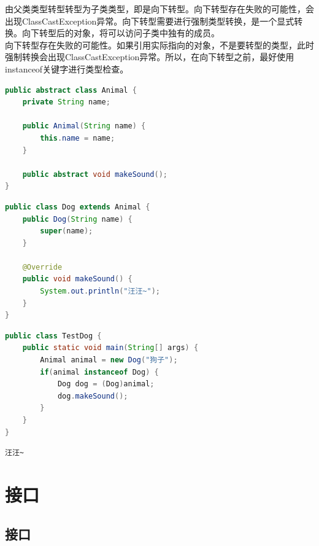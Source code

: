 由父类类型转型转型为子类类型，即是向下转型。向下转型存在失败的可能性，会出现ClassCastException异常。向下转型需要进行强制类型转换，是一个显式转换。向下转型后的对象，将可以访问子类中独有的成员。\\

向下转型存在失败的可能性。如果引用实际指向的对象，不是要转型的类型，此时强制转换会出现ClassCastException异常。所以，在向下转型之前，最好使用instanceof关键字进行类型检查。\\


\begin{lstlisting}[language=Java, title=Animal.java]
public abstract class Animal {
    private String name;

    public Animal(String name) {
        this.name = name;
    }

    public abstract void makeSound();
}
\end{lstlisting}

\begin{lstlisting}[language=Java, title=Dog.java]
public class Dog extends Animal {
    public Dog(String name) {
        super(name);
    }
    
    @Override
    public void makeSound() {
        System.out.println("汪汪~");
    }
}
\end{lstlisting}

\begin{lstlisting}[language=Java, title=TestDog.java]
public class TestDog {
    public static void main(String[] args) {
        Animal animal = new Dog("狗子");
        if(animal instanceof Dog) {
            Dog dog = (Dog)animal;
            dog.makeSound();
        }
    }
}
\end{lstlisting}

\begin{tcolorbox}
	\begin{verbatim}
汪汪~
	\end{verbatim}
\end{tcolorbox}

\newpage

\section{接口}

\subsection{接口}

